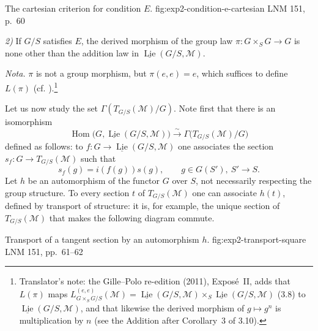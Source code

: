   {The cartesian criterion for condition \(E\).}
  {fig:exp2-condition-e-cartesian}
  {LNM 151, p.~60}

\textit{2)} If \(G/S\) satisfies \(E\), the derived morphism of the group
law \(\pi:G\times_SG\to G\) is none other than the addition law in
\(\underline{\operatorname{Lie}}(G/S,\mathcal M)\).

\textit{Nota.} \(\pi\) is not a group morphism, but \(\pi(e,e)=e\), which
suffices to define \(L(\pi)\) (cf. ).\footnote{Translator's note: the
Gille--Polo re-edition (2011), Expos\'e~II, adds that \(L(\pi)\) maps
\(L^{(e,e)}_{G\times_SG/S}(\mathcal M)=\underline{\operatorname{Lie}}(G/S,\mathcal M)
\times_S\underline{\operatorname{Lie}}(G/S,\mathcal M)\) (3.8) to
\(\underline{\operatorname{Lie}}(G/S,\mathcal M)\), and that likewise the
derived morphism of \(g\mapsto g^n\) is multiplication by \(n\) (see the
Addition after Corollary~3 of 3.10).}

Let us now study the set \(\Gamma(T_{G/S}(\mathcal M)/G)\). Note first
that there is an isomorphism
\[
  \operatorname{Hom}\bigl(G,\underline{\operatorname{Lie}}(G/S,\mathcal M)\bigr)
  \xrightarrow{\sim}\Gamma\bigl(T_{G/S}(\mathcal M)/G\bigr)
\]
defined as follows: to
\(f:G\to\underline{\operatorname{Lie}}(G/S,\mathcal M)\) one associates
the section \(s_f:G\to T_{G/S}(\mathcal M)\) such that
\[
  s_f(g)=i(f(g))s(g),\qquad g\in G(S'),\ S'\to S.
\]
Let \(h\) be an automorphism of the functor \(G\) over \(S\), not
necessarily respecting the group structure. To every section \(t\) of
\(T_{G/S}(\mathcal M)\) one can associate \(h(t)\), defined by transport
of structure: it is, for example, the unique section of
\(T_{G/S}(\mathcal M)\) that makes the following diagram commute.

  {Transport of a tangent section by an automorphism \(h\).}
  {fig:exp2-transport-square}
  {LNM 151, pp.~61--62}

